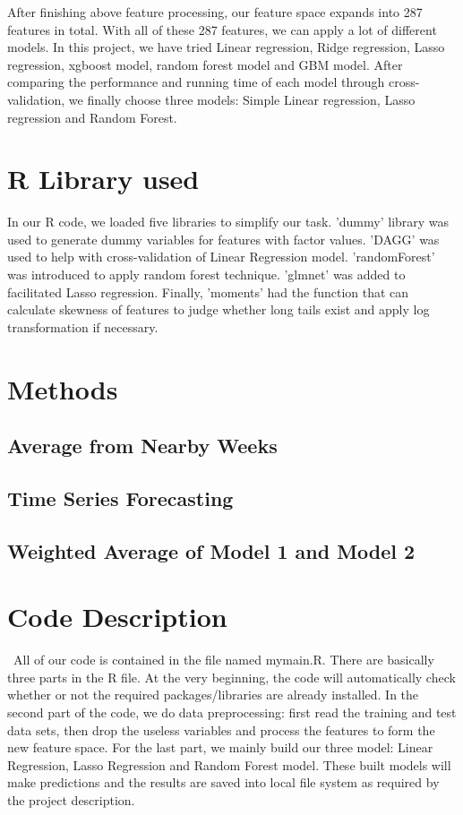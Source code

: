 \documentclass[12pt]{article}
\begin{document}
After finishing above feature processing, our feature space expands into 287 features in total. With all of these 287 features, we can apply a lot of different models. In this project, we have tried Linear regression, Ridge regression, Lasso regression, xgboost model, random forest model and GBM model. After comparing the performance and running time of each model through cross-validation, we finally choose three models: Simple Linear regression, Lasso regression and Random Forest.

\section{R Library used}
In our R code, we loaded five libraries to simplify our task. 'dummy' library was used to generate dummy variables for features with factor values. 'DAGG' was used to help with cross-validation of Linear Regression model. 'randomForest' was introduced to apply random forest technique. 'glmnet' was added to facilitated Lasso regression. Finally, 'moments' had the function that can calculate skewness of features to judge whether long tails exist and apply log transformation if necessary.

\section{Methods}

\subsection{Average from Nearby Weeks}


\subsection{Time Series Forecasting}


\subsection{Weighted Average of Model 1 and Model 2}


\section{Code Description}
\quad\ All of our code is contained in the file named mymain.R. There are basically three parts in the R file. At the very beginning, the code will automatically check whether or not the required packages/libraries are already installed. In the second part of the code, we do data preprocessing: first read the training and test data sets, then drop the useless variables and process the features to form the new feature space. For the last part, we mainly build our three model: Linear Regression, Lasso Regression and Random Forest model. These built models will make predictions and the results are saved into local file system as required by the project description.
\end{document}
